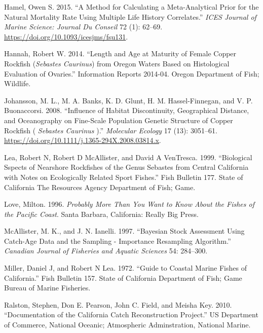 \documentclass[11pt,
  english,
  a4paper,
]{article}
\begin{document}
\begin{cslreferences}
\leavevmode\hypertarget{ref-hamel_method_2015}{}%
Hamel, Owen S. 2015. ``A Method for Calculating a Meta-Analytical Prior for the Natural Mortality Rate Using Multiple Life History Correlates.'' \emph{ICES Journal of Marine Science: Journal Du Conseil} 72 (1): 62--69. \url{https://doi.org/10.1093/icesjms/fsu131}.

\leavevmode\hypertarget{ref-hannah_length_2014}{}%
Hannah, Robert W. 2014. ``Length and Age at Maturity of Female Copper Rockfish (\emph{Sebastes Caurinus}) from Oregon Waters Based on Histological Evaluation of Ovaries.'' Information Reports 2014-04. Oregon Department of Fish; Wildlife.

\leavevmode\hypertarget{ref-johansson_influence_2008}{}%
Johansson, M. L., M. A. Banks, K. D. Glunt, H. M. Hassel-Finnegan, and V. P. Buonaccorsi. 2008. ``Influence of Habitat Discontinuity, Geographical Distance, and Oceanography on Fine-Scale Population Genetic Structure of Copper Rockfish ( \emph{Sebastes Caurinus} ).'' \emph{Molecular Ecology} 17 (13): 3051--61. \url{https://doi.org/10.1111/j.1365-294X.2008.03814.x}.

\leavevmode\hypertarget{ref-lea_biological_1999}{}%
Lea, Robert N, Robert D McAllister, and David A VenTresca. 1999. ``Biological Sspects of Nearshore Rockfishes of the Genus Sebastes from Central California with Notes on Ecologically Related Sport Fishes.'' Fish Bulletin 177. State of California The Resources Agency Department of Fish; Game.

\leavevmode\hypertarget{ref-love_milton_probably_1996}{}%
Love, Milton. 1996. \emph{Probably More Than You Want to Know About the Fishes of the Pacific Coast}. Santa Barbara, California: Really Big Press.

\leavevmode\hypertarget{ref-mcallister_bayesian_1997}{}%
McAllister, M. K., and J. N. Ianelli. 1997. ``Bayesian Stock Assessment Using Catch-Age Data and the Sampling - Importance Resampling Algorithm.'' \emph{Canadian Journal of Fisheries and Aquatic Sciences} 54: 284--300.

\leavevmode\hypertarget{ref-miller_guide_1972}{}%
Miller, Daniel J, and Robert N Lea. 1972. ``Guide to Coastal Marine Fishes of California.'' Fish Bulletin 157. State of California Department of Fish; Game Bureau of Marine Fisheries.

\leavevmode\hypertarget{ref-ralston_documentation_2010}{}%
Ralston, Stephen, Don E. Pearson, John C. Field, and Meisha Key. 2010. ``Documentation of the California Catch Reconstruction Project.'' US Department of Commerce, National Oceanic; Atmospheric Adminstration, National Marine.


\end{cslreferences}
\end{document}

